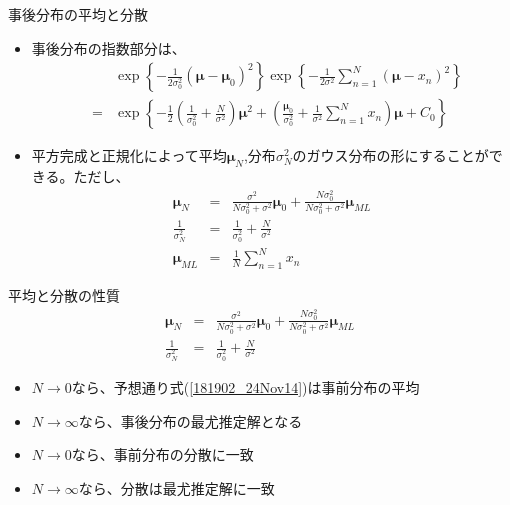 \begin{frame}{事後分布の平均と分散}
 \begin{itemize}
  \item 事後分布の指数部分は、
        \begin{eqnarray}
         & &\exp\left\{-\frac{1}{2\sigma_0^2}(\bm{\mu}-\bm{\mu}_0)^2\right\} \exp\left\{-\frac{1}{2\sigma^2}\sum_{n=1}^{N}(\bm{\mu}-x_n)^2\right\} \nonumber \\
         &= & \exp\left\{-\frac{1}{2}\left(\frac{1}{\sigma_0^2}+\frac{N}{\sigma^2}\right)\bm{\mu}^2 +\left(\frac{\bm{\mu}_0}{\sigma_0^2}+\frac{1}{\sigma^2}\sum_{n=1}^{N}x_n\right)\bm{\mu} +C_0 \right\} \nonumber
        \end{eqnarray}
  \item 平方完成と正規化によって平均$\bm{\mu}_N$,分布$\sigma_N^2$のガウス分布の形にすることができる。ただし、
        \begin{eqnarray}
         \bm{\mu}_N& = & \frac{\sigma^2}{N\sigma_0^2+\sigma^2}\bm{\mu}_0 + \frac{N\sigma_0^2}{N\sigma_0^2+\sigma^2}\bm{\mu}_{ML}\label{223654_18Nov14}\\
         \frac{1}{\sigma_N^2}&= & \frac{1}{\sigma_0^2} + \frac{N}{\sigma^2}\label{181817_24Nov14}\\
         \bm{\mu}_{ML}&= & \frac{1}{N}\sum_{n=1}^{N}x_n
        \end{eqnarray}
 \end{itemize}
\end{frame}

\begin{frame}{平均と分散の性質}
 \begin{eqnarray}
  \bm{\mu}_N& = & \frac{\sigma^2}{N\sigma_0^2+\sigma^2}\bm{\mu}_0 + \frac{N\sigma_0^2}{N\sigma_0^2+\sigma^2}\bm{\mu}_{ML}\label{181902_24Nov14}\\
  \frac{1}{\sigma_N^2}&= & \frac{1}{\sigma_0^2} + \frac{N}{\sigma^2}
 \end{eqnarray}
 \begin{itemize}
  \item $N\rightarrow0$なら、予想通り式(\ref{181902_24Nov14})は事前分布の平均
  \item $N\rightarrow\infty$なら、事後分布の最尤推定解となる
  \item $N\rightarrow0$なら、事前分布の分散に一致
  \item $N\rightarrow\infty$なら、分散は最尤推定解に一致
 \end{itemize}
\end{frame}

